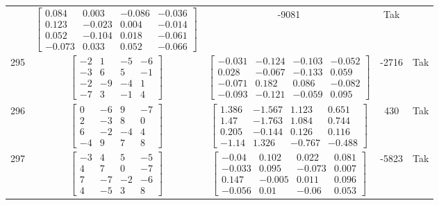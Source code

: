 \documentclass[a4paper,12pt]{article}
\begin{document}
\begin{tabular}{c c c c c}
&
$\begin{bmatrix} 0.084 & 0.003 & -0.086 & -0.036 \\ 0.123 & -0.023 & 0.004 & -0.014 \\ 0.052 & -0.104 & 0.018 & -0.061 \\ -0.073 & 0.033 & 0.052 & -0.066 \end{bmatrix}$
&
-9081
&
Tak
\\
295
&
$\begin{bmatrix} -2 & 1 & -5 & -6 \\ -3 & 6 & 5 & -1 \\ -2 & -9 & -4 & 1 \\ -7 & 3 & -1 & 4 \end{bmatrix}$
&
$\begin{bmatrix} -0.031 & -0.124 & -0.103 & -0.052 \\ 0.028 & -0.067 & -0.133 & 0.059 \\ -0.071 & 0.182 & 0.086 & -0.082 \\ -0.093 & -0.121 & -0.059 & 0.095 \end{bmatrix}$
&
-2716
&
Tak
\\
296
&
$\begin{bmatrix} 0 & -6 & 9 & -7 \\ 2 & -3 & 8 & 0 \\ 6 & -2 & -4 & 4 \\ -4 & 9 & 7 & 8 \end{bmatrix}$
&
$\begin{bmatrix} 1.386 & -1.567 & 1.123 & 0.651 \\ 1.47 & -1.763 & 1.084 & 0.744 \\ 0.205 & -0.144 & 0.126 & 0.116 \\ -1.14 & 1.326 & -0.767 & -0.488 \end{bmatrix}$
&
430
&
Tak
\\
297
&
$\begin{bmatrix} -3 & 4 & 5 & -5 \\ 4 & 7 & 0 & -7 \\ 7 & -7 & -2 & -6 \\ 4 & -5 & 3 & 8 \end{bmatrix}$
&
$\begin{bmatrix} -0.04 & 0.102 & 0.022 & 0.081 \\ -0.033 & 0.095 & -0.073 & 0.007 \\ 0.147 & -0.005 & 0.011 & 0.096 \\ -0.056 & 0.01 & -0.06 & 0.053 \end{bmatrix}$
&
-5823
&
Tak
\\

\end{tabular}
\end{document}
